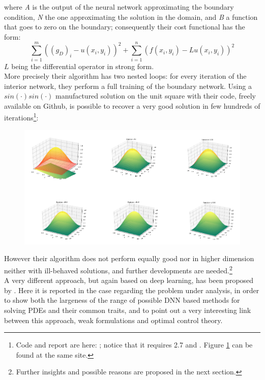 \documentclass[12pt, a4paper]{report}
\theoremstyle{definition}
\begin{document}
{\begin{equation}
\end{equation}
where \textit{A} is the output of the neural network approximating the boundary condition, \textit{N} the one approximating the solution in the domain, and \textit{B} a function that goes to zero on the boundary; consequently their cost functional has the form:
\begin{equation}\label{cost_kailai}
\sum_{i=1}^m\left((g_D)_i - u(x_i,y_i)\right)^2 + \sum_{i=1}^n\left(f(x_i,y_i) - Lu(x_i,y_i)\right)^2
\end{equation}
$L$ being the differential operator in strong form.\\
More precisely their algorithm has two nested loops: for every iteration of the interior network, they perform a full training of the boundary network. Using a $sin(\cdot)sin(\cdot)$ manufactured solution on the unit square with their code, freely available on Github, is possible to recover a very good solution in few hundreds of iterations\footnote{Code and report are here: \cite{Kailai}; notice that it requires \cite{python} 2.7 and \cite{tensorflow}. Figure \ref{pd1} can be found at the same site.}:
\begin{figure}[H]
	\centering
	\includegraphics[width=14cm]{img/pd1.png}
	\caption{}\label{pd1}
\end{figure}
\noindent However their algorithm does not perform equally good nor in higher dimension neither with ill-behaved solutions, and further developments are needed.\footnote{Further insights and possible reasons are proposed in the next section.}\\
\newline \noindent A very different approach, but again based on deep learning, has been proposed by \cite{Weinan}. Here it is reported in the case regarding the problem under analysis, in order to show both the largeness of the range of possible DNN based methods for solving PDEs and their common traits, and to point out a very interesting link between this approach, weak formulations and optimal control theory.\\
}
\end{document}
